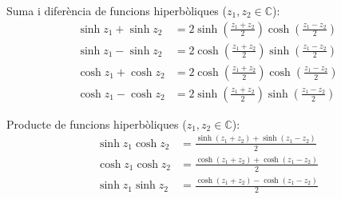 Suma i difer\`{e}ncia de funcions hiperb\`{o}liques ($z_1,
z_2\in\mathbb{C}$):
\begin{subequations}
\begin{align}
    \sinh z_1+\sinh z_2 &= 2 \sinh\left(\frac{z_1+z_2}{2}\right)
    \cosh\left(\frac{z_1-z_2}{2}\right)\\[1ex]
    \sinh z_1-\sinh z_2 &= 2 \cosh\left(\frac{z_1+z_2}{2}\right)
    \sinh\left(\frac{z_1-z_2}{2}\right)\\[1ex]
    \cosh z_1+\cosh z_2 &= 2 \cosh\left(\frac{z_1+z_2}{2}\right)
    \cosh\left(\frac{z_1-z_2}{2}\right)\\[1ex]
    \cosh z_1-\cosh z_2 &= 2 \sinh\left(\frac{z_1+z_2}{2}\right)
    \sinh\left(\frac{z_1-z_2}{2}\right)
\end{align}
\end{subequations}

Producte de funcions hiperb\`{o}liques ($z_1, z_2\in\mathbb{C}$):
\begin{subequations}
\begin{align}
    \sinh z_1 \cosh z_2 &=
    \frac{\sinh(z_1+z_2)+\sinh(z_1-z_2)}{2}\\[1ex]
    \cosh z_1 \cosh z_2 &=
    \frac{\cosh(z_1+z_2)+\cosh(z_1-z_2)}{2}\\[1ex]
    \sinh z_1 \sinh z_2 &=
    \frac{\cosh(z_1+z_2)-\cosh(z_1-z_2)}{2}
\end{align}
\end{subequations}
